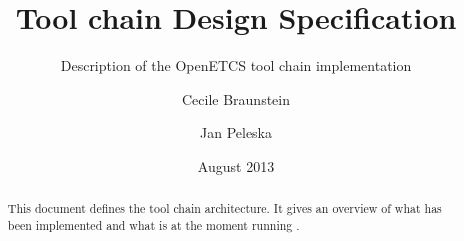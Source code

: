 \documentclass{template/openetcs_report}
\begin{document}
\frontmatter
{}




\title{Tool chain Design Specification}

\subtitle{Description of the OpenETCS tool chain implementation}

\date{August 2013}






\author{Cecile Braunstein \and Jan Peleska}







\begin{abstract}
This document defines the tool chain architecture. It gives an
overview of what has been implemented and what is at the moment running .
\end{abstract}

\maketitle
\tableofcontents
\listoffiguresandtables

\newpage

\end{document}

